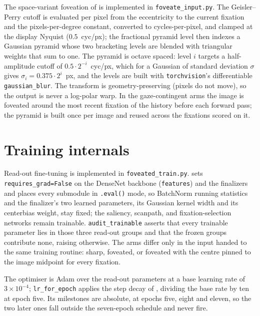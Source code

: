 The space-variant foveation of  is implemented in \texttt{foveate\_input.py}. The
Geisler--Perry cutoff  is evaluated per pixel from the eccentricity to the current
fixation and the pixels-per-degree constant, converted to cycles-per-pixel, and clamped at the display
Nyquist ($0.5$~cyc/px); the fractional pyramid level  then indexes a Gaussian pyramid
whose two bracketing levels are blended with triangular weights that sum to one. The pyramid is octave
spaced: level $i$ targets a half-amplitude cutoff of $0.5 \cdot 2^{-i}$~cyc/px, which for a Gaussian of
standard deviation $\sigma$ gives $\sigma_i = 0.375 \cdot 2^{i}$~px, and the levels are built with
\texttt{torchvision}'s differentiable \texttt{gaussian\_blur}. The transform is geometry-preserving
(pixels do not move), so the output is never a log-polar warp. In the gaze-contingent arms the image is
foveated around the most recent fixation of the history before each forward pass; the pyramid is built
once per image and reused across the fixations scored on it.

\section{Training internals}
\label{app:training}

Read-out fine-tuning is implemented in \texttt{foveated\_train.py}.  sets
\texttt{requires\_grad=False} on the DenseNet backbone (\texttt{features}) and the finalizers and places
every submodule in \texttt{.eval()} mode, so BatchNorm running statistics and the finalizer's two learned
parameters, its Gaussian kernel width and its centerbias weight, stay fixed; the saliency, scanpath, and
fixation-selection networks remain trainable.
\texttt{audit\_trainable} asserts that every trainable parameter lies in those three read-out groups and that
the frozen groups contribute none, raising otherwise. The arms differ only in the input handed to the
same training routine: sharp, foveated, or foveated with the centre pinned to the image midpoint for
every fixation.

The optimiser is Adam over the read-out parameters at a base learning rate
of $3 \times 10^{-4}$; \texttt{lr\_for\_epoch} applies the step decay of ,
dividing the base rate by ten at epoch five. Its milestones are absolute, at epochs five, eight and
eleven, so the two later ones fall outside the seven-epoch schedule and never fire.

